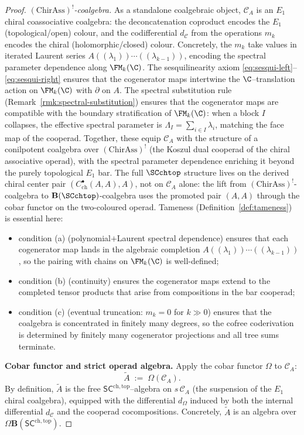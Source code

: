 \begin{proof}
\emph{\((\mathrm{ChirAss})^!\)-coalgebra.}
As a standalone coalgebraic object, $\mathcal{C}_A$ is an $E_1$
chiral coassociative coalgebra: the deconcatenation coproduct
encodes the $E_1$ (topological/open) colour, and the codifferential
$d_{\mathcal{C}}$ from the operations $m_k$ encodes the chiral
(holomorphic/closed) colour. Concretely, the $m_k$ take values in
iterated Laurent series
$A((\lambda_1))\cdots((\lambda_{k-1}))$, encoding the spectral
parameter dependence along $\FM_k(\C)$. The sesquilinearity axiom
\eqref{eq:sesqui-left}--\eqref{eq:sesqui-right} ensures that the
cogenerator maps intertwine the $\C$--translation action on
$\FM_k(\C)$ with $\partial$ on $A$.
The spectral substitution rule (Remark~\ref{rmk:spectral-substitution})
ensures that the cogenerator maps are compatible with the boundary
stratification of $\FM_k(\C)$: when a block $I$ collapses, the
effective spectral parameter is $\Lambda_I = \sum_{i \in I} \lambda_i$,
matching the face map of the cooperad.
Together, these equip $\mathcal{C}_A$ with the structure of a
conilpotent coalgebra over $(\mathrm{ChirAss})^!$
(the Koszul dual cooperad of the chiral associative operad),
with the spectral parameter dependence enriching it beyond the
purely topological $E_1$ bar. The full $\SCchtop$ structure lives
on the derived chiral center pair $(C^\bullet_{\mathrm{ch}}(A,A), A)$, not
on $\mathcal{C}_A$ alone: the lift from
$(\mathrm{ChirAss})^!$-coalgebra to $\mathbf B(\SCchtop)$-coalgebra
uses the promoted pair $(A,A)$ through the cobar functor on the
two-coloured operad.
Tameness (Definition~\ref{def:tameness}) is essential here:
\begin{itemize}
 \item condition (a) (polynomial$+$Laurent spectral dependence)
 ensures that each cogenerator map lands in the algebraic
 completion $A((\lambda_1))\cdots((\lambda_{k-1}))$, so the
 pairing with chains on $\FM_k(\C)$ is well-defined;
 \item condition (b) (continuity) ensures the cogenerator maps
 extend to the completed tensor products that arise from
 compositions in the bar cooperad;
 \item condition (c) (eventual truncation: $m_k = 0$ for $k \gg 0$)
 ensures that the coalgebra is concentrated in finitely many
 degrees, so the cofree coderivation is determined by finitely
 many cogenerator projections and all tree sums terminate.
\end{itemize}

\medskip
\textbf{Cobar functor and strict operad algebra.}
Apply the cobar functor $\Omega$ to $\mathcal{C}_A$:
\[
 \widetilde{A} \;:=\; \Omega(\mathcal{C}_A).
\]
By definition, $\widetilde{A}$ is the free
$\mathsf{SC}^{\mathrm{ch,top}}$--algebra on $s\,\mathcal{C}_A$
(the suspension of the $E_1$ chiral coalgebra), equipped with the
differential $d_\Omega$ induced by both the internal differential
$d_{\mathcal{C}}$ and the cooperad cocompositions. Concretely,
$\widetilde{A}$ is an algebra over
$\Omega\mathbf{B}(\mathsf{SC}^{\mathrm{ch,top}})$.


\end{proof}
